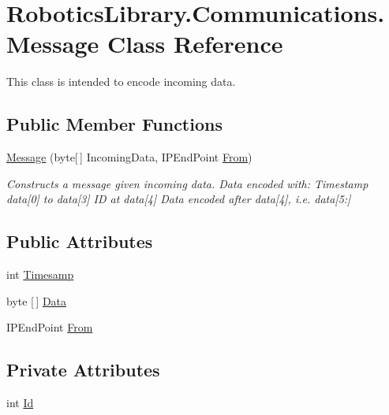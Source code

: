 \hypertarget{class_robotics_library_1_1_communications_1_1_message}{}\section{Robotics\+Library.\+Communications.\+Message Class Reference}
\label{class_robotics_library_1_1_communications_1_1_message}


This class is intended to encode incoming data.  


\subsection*{Public Member Functions}
\begin{DoxyCompactItemize}
\item 
\hyperlink{class_robotics_library_1_1_communications_1_1_message_a9e6e25188a64e3cc1c71282c2578cc4e}{Message} (byte\mbox{[}$\,$\mbox{]} Incoming\+Data, I\+P\+End\+Point \hyperlink{class_robotics_library_1_1_communications_1_1_message_a51a162a1d00eb020c5af595cc84bf604}{From})
\begin{DoxyCompactList}\small\item\em Constructs a message given incoming data. Data encoded with\+: Timestamp data\mbox{[}0\mbox{]} to data\mbox{[}3\mbox{]} ID at data\mbox{[}4\mbox{]} Data encoded after data\mbox{[}4\mbox{]}, i.\+e. data\mbox{[}5\+:\mbox{]} \end{DoxyCompactList}\end{DoxyCompactItemize}
\subsection*{Public Attributes}
\begin{DoxyCompactItemize}
\item 
int \hyperlink{class_robotics_library_1_1_communications_1_1_message_ae1ab1ac8b229f8ba8bc9ff8762c83236}{Timesamp}
\item 
byte \mbox{[}$\,$\mbox{]} \hyperlink{class_robotics_library_1_1_communications_1_1_message_a69bb31eb51f778726ae40b2257e7e053}{Data}
\item 
I\+P\+End\+Point \hyperlink{class_robotics_library_1_1_communications_1_1_message_a51a162a1d00eb020c5af595cc84bf604}{From}
\end{DoxyCompactItemize}
\subsection*{Private Attributes}
\begin{DoxyCompactItemize}
\item 
int \hyperlink{class_robotics_library_1_1_communications_1_1_message_a018b1bfaa0ad1ace329a785fa687d9b3}{Id}
\end{DoxyCompactItemize}


